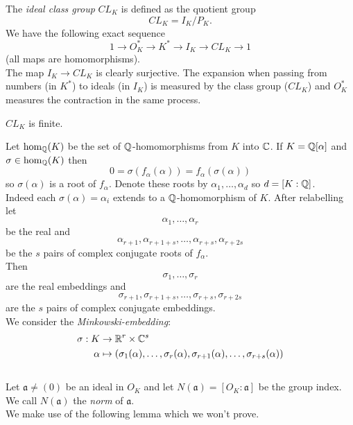 \documentclass[NumTh.tex]{subfiles}
\begin{document}
The \emph{ideal class group} $CL_K$ is defined as the quotient group
\[ CL_K = I_K/P_K \text{.} \]
We have the following exact sequence
\[ 1 \to O_K^\ast \to K^\ast \to I_K \to CL_K \to 1 \]
(all maps are homomorphisms).\\
The map $I_K \to CL_K$ is clearly surjective.
The expansion when passing from numbers (in $K^\ast$) to ideals (in $I_K$) is measured by the class group ($CL_K$)
and $O_K^\ast$ measures the contraction in the same process.

\begin{theorem}\label{th_3_4_3}
  $CL_K$ is finite.
\end{theorem}

Let $\hom_{\mathbb{Q}}(K)$ be the set of $\mathbb{Q}$-homomorphisms from $K$ into $\mathbb{C}$.
If $K = \mathbb{Q}[\alpha]$ and $\sigma \in \hom_{\mathbb{Q}}(K)$ then
\[ 0 = \sigma(f_\alpha(\alpha)) = f_\alpha(\sigma ( \alpha)) \]
so $\sigma(\alpha)$ is a root of $f_\alpha$.
Denote these roots by $\alpha_1,\dots,\alpha_d$ so $d = [K:\mathbb{Q}]$.\\
Indeed each $\sigma(\alpha) = \alpha_i$ extends to a $\mathbb{Q}$-homomorphism of $K$.
After relabelling let 
\[ \alpha_1,\dots,\alpha_r \] 
be the real and
\[ \alpha_{r+1},\alpha_{r+1+s},\dots,\alpha_{r+s},\alpha_{r + 2s} \] 
be the $s$ pairs of complex conjugate roots of $f_\alpha$.\\
Then
\[ \sigma_1,\dots,\sigma_r \]
are the real embeddings and
\[ \sigma_{r+1},\sigma_{r+1+s},\dots,\sigma_{r+s},\sigma_{r+2s} \]
are the $s$ pairs of complex conjugate embeddings.\\
We consider the \emph{Minkowski-embedding}:
\begin{align*}
  \sigma: K &\to \mathbb{R}^r \times \mathbb{C}^s \\
  \alpha &\mapsto (\sigma_1(\alpha),\dots,\sigma_r(\alpha),\sigma_{r+1}(\alpha),\dots,\sigma_{r+s}(\alpha))
\end{align*}
\\

Let $\mathfrak{a} \neq (0)$ be an ideal in $O_K$ and let $N(\mathfrak{a}) = [O_K:\mathfrak{a}]$ be the group index.
We call $N(\mathfrak{a})$ the \emph{norm} of $\mathfrak{a}$.
\\

We make use of the following lemma which we won't prove.
\end{document}
